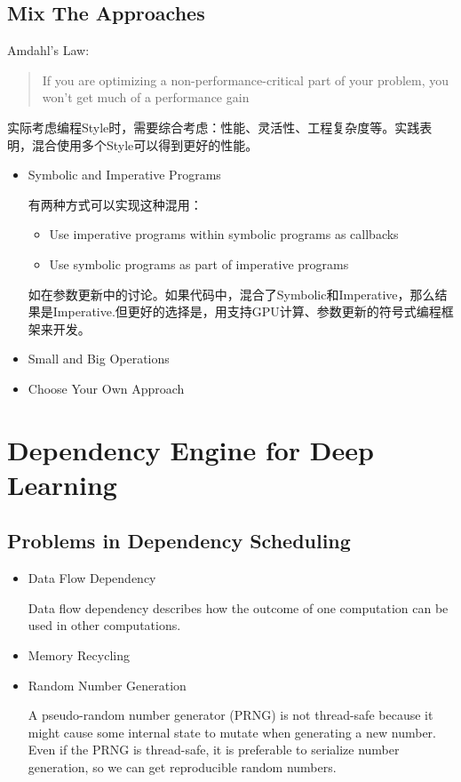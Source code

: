 \subsection{Mix The Approaches}

Amdahl's Law:
\begin{quote}
 If you are optimizing a non-performance-critical part of your problem, you won’t get much of a performance gain
\end{quote}

实际考虑编程Style时，需要综合考虑：性能、灵活性、工程复杂度等。实践表明，混合使用多个Style可以得到更好的性能。

\begin{itemize}
\item Symbolic and Imperative Programs

有两种方式可以实现这种混用：
\begin{itemize}
\item Use imperative programs within symbolic programs as callbacks
\item Use symbolic programs as part of imperative programs
\end{itemize}
如在参数更新中的讨论。如果代码中，混合了Symbolic和Imperative，那么结果是Imperative.但更好的选择是，用支持GPU计算、参数更新的符号式编程框架来开发。

\item Small and Big Operations
\item Choose Your Own Approach
\end{itemize}

\section{Dependency Engine for Deep Learning}

\subsection{Problems in Dependency Scheduling}

\begin{itemize}
\item Data Flow Dependency

Data flow dependency describes how the outcome of one computation can be used in other computations. 

\item Memory Recycling

\item Random Number Generation

A pseudo-random number generator (PRNG) is not thread-safe because it might cause some internal state to mutate when generating a new number. Even if the PRNG is thread-safe, it is preferable to serialize number generation, so we can get reproducible random numbers.

\end{itemize}

